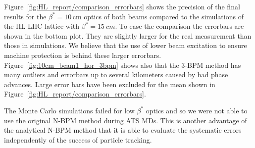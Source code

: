 Figure~\ref{fig:HL_report/comparison_errorbars} shows the precision of the final results for the $ \beta^*=10\,\text{cm} $ optics of both beams compared to the simulations of the HL-LHC lattice with $ \beta^*=\SI{15}{cm} $. To ease the comparison the errorbars are
shown in the bottom plot. They are slightly larger for the real measurement than those in simulations. We believe that the use of lower beam excitation   to ensure machine protection is behind these larger errorbars. Figure~\ref{fig:10cm_beam1_hor_3bpm} shows also that the 3-BPM method has many outliers and errorbars up to several kilometers caused by bad phase advances. Large error bars have been excluded for the mean shown in Figure~\ref{fig:HL_report/comparison_errorbars}.



The Monte Carlo simulations failed for low $ \beta^* $ optics and so we were not able to use the original N-BPM method during ATS MDs. This is another advantage of the analytical N-BPM method that it is
able to evaluate the systematic errors independently of the success of particle tracking.
